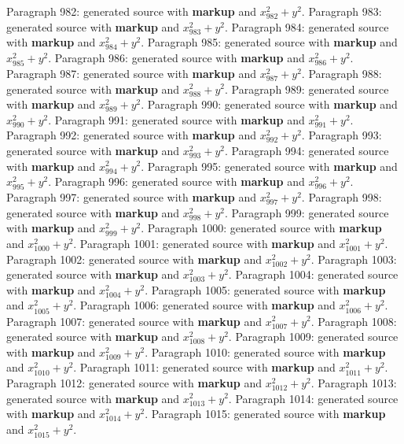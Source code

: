 \documentclass{article}
\begin{document}
Paragraph 982: generated source with \textbf{markup} and $x_{982}^2 + y^2$.
Paragraph 983: generated source with \textbf{markup} and $x_{983}^2 + y^2$.
Paragraph 984: generated source with \textbf{markup} and $x_{984}^2 + y^2$.
Paragraph 985: generated source with \textbf{markup} and $x_{985}^2 + y^2$.
Paragraph 986: generated source with \textbf{markup} and $x_{986}^2 + y^2$.
Paragraph 987: generated source with \textbf{markup} and $x_{987}^2 + y^2$.
Paragraph 988: generated source with \textbf{markup} and $x_{988}^2 + y^2$.
Paragraph 989: generated source with \textbf{markup} and $x_{989}^2 + y^2$.
Paragraph 990: generated source with \textbf{markup} and $x_{990}^2 + y^2$.
Paragraph 991: generated source with \textbf{markup} and $x_{991}^2 + y^2$.
Paragraph 992: generated source with \textbf{markup} and $x_{992}^2 + y^2$.
Paragraph 993: generated source with \textbf{markup} and $x_{993}^2 + y^2$.
Paragraph 994: generated source with \textbf{markup} and $x_{994}^2 + y^2$.
Paragraph 995: generated source with \textbf{markup} and $x_{995}^2 + y^2$.
Paragraph 996: generated source with \textbf{markup} and $x_{996}^2 + y^2$.
Paragraph 997: generated source with \textbf{markup} and $x_{997}^2 + y^2$.
Paragraph 998: generated source with \textbf{markup} and $x_{998}^2 + y^2$.
Paragraph 999: generated source with \textbf{markup} and $x_{999}^2 + y^2$.
Paragraph 1000: generated source with \textbf{markup} and $x_{1000}^2 + y^2$.
Paragraph 1001: generated source with \textbf{markup} and $x_{1001}^2 + y^2$.
Paragraph 1002: generated source with \textbf{markup} and $x_{1002}^2 + y^2$.
Paragraph 1003: generated source with \textbf{markup} and $x_{1003}^2 + y^2$.
Paragraph 1004: generated source with \textbf{markup} and $x_{1004}^2 + y^2$.
Paragraph 1005: generated source with \textbf{markup} and $x_{1005}^2 + y^2$.
Paragraph 1006: generated source with \textbf{markup} and $x_{1006}^2 + y^2$.
Paragraph 1007: generated source with \textbf{markup} and $x_{1007}^2 + y^2$.
Paragraph 1008: generated source with \textbf{markup} and $x_{1008}^2 + y^2$.
Paragraph 1009: generated source with \textbf{markup} and $x_{1009}^2 + y^2$.
Paragraph 1010: generated source with \textbf{markup} and $x_{1010}^2 + y^2$.
Paragraph 1011: generated source with \textbf{markup} and $x_{1011}^2 + y^2$.
Paragraph 1012: generated source with \textbf{markup} and $x_{1012}^2 + y^2$.
Paragraph 1013: generated source with \textbf{markup} and $x_{1013}^2 + y^2$.
Paragraph 1014: generated source with \textbf{markup} and $x_{1014}^2 + y^2$.
Paragraph 1015: generated source with \textbf{markup} and $x_{1015}^2 + y^2$.
\end{document}
